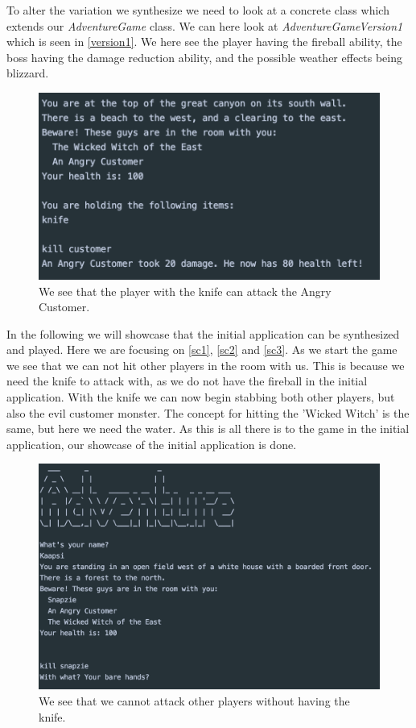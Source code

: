 To alter the variation we synthesize we need to look at a concrete class which extends our \textit{AdventureGame} class. We can here look at \textit{AdventureGameVersion1} which is seen in \autoref{version1}. We here see the player having the fireball ability, the boss having the damage reduction ability, and the possible weather effects being blizzard.

\begin{figure}
	\centering
	\includegraphics[width=\linewidth]{Materials/Results/AttackingCustomer}
	\caption{We see that the player with the knife can attack the Angry Customer.}
	\label{sc1}
\end{figure}
In the following we will showcase that the initial application can be synthesized and played. Here we are focusing on \autoref{sc1}, \autoref{sc2} and \autoref{sc3}. As we start the game we see that we can not hit other players in the room with us. This is because we need the knife to attack with, as we do not have the fireball in the initial application. With the knife we can now begin stabbing both other players, but also the evil customer monster. The concept for hitting the 'Wicked Witch' is the same, but here we need the water. As this is all there is to the game in the initial application, our showcase of the initial application is done.

\begin{figure}[H]
	\centering
	\includegraphics[width=0.9\linewidth]{Materials/Results/PlayersEntering}
	\caption{We see that we cannot attack other players without having the knife.}
	\label{sc2}
\end{figure}

